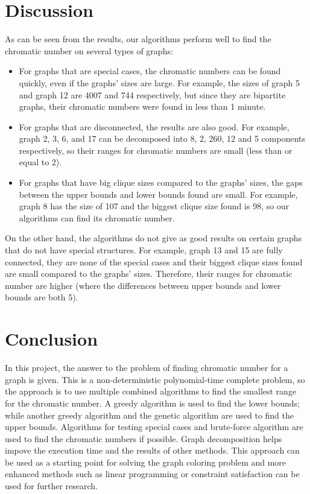 \documentclass[a4paper]{report}
\begin{document}
	\chapter{Discussion}
	As can be seen from the results, our algorithms perform well to find the chromatic number on several types of graphs:
	\begin{itemize}
		\item For graphs that are special cases, the chromatic numbers can be found quickly, even if the graphs' sizes are large. For example, the sizes of graph 5 and graph 12 are 4007 and 744 respectively, but since they are bipartite graphs, their chromatic numbers were found in less than 1 minute.
		\item For graphs that are disconnected, the results are also good. For example, graph 2, 3, 6, and 17 can be decomposed into 8, 2, 260, 12 and 5 components respectively, so their ranges for chromatic numbers are small (less than or equal to 2).
		\item For graphs that have big clique sizes compared to the graphs' sizes, the gaps between the upper bounds and lower bounds found are small. For example, graph 8 has the size of 107 and the biggest clique size found is 98, so our algorithms can find its chromatic number.
	\end{itemize}
	On the other hand, the algorithms do not give as good results on certain graphs that do not have special structures. For example, graph 13 and 15 are fully connected, they are none of the special cases and their biggest clique sizes found are small compared to the graphs' sizes. Therefore, their ranges for chromatic number are higher (where the differences between upper bounds and lower bounds are both 5).
	
	\chapter{Conclusion}
	In this project, the answer to the problem of finding chromatic number for a graph is given. This is a non-deterministic polynomial-time complete problem, so the approach is to use multiple combined algorithms to find the smallest range for the chromatic number. A greedy algorithm is used to find the lower bounds; while another greedy algorithm and the genetic algorithm are used to find the upper bounds. Algorithms for testing special cases and brute-force algorithm are used to find the chromatic numbers if possible. Graph decomposition helps impove the execution time and the results of other methods. This approach can be used as a starting point for solving the graph coloring problem and more enhanced methods such as linear programming or constraint satisfaction can be used for further research.
	
	
	
	
\end{document}
